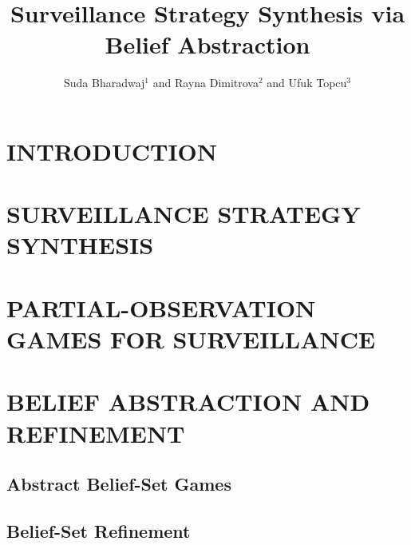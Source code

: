 \documentclass[letterpaper, 10 pt, conference]{ieeeconf}  %
\title{\LARGE \bf
Surveillance Strategy Synthesis via Belief Abstraction
}
\author{Suda Bharadwaj$^{1}$ and Rayna Dimitrova$^{2}$ and Ufuk Topcu$^{3}$%
}
\begin{document}
\maketitle
\thispagestyle{empty}
\pagestyle{empty}


\begin{abstract}

\end{abstract}


\section{INTRODUCTION}




\section{SURVEILLANCE STRATEGY SYNTHESIS}




\section{PARTIAL-OBSERVATION GAMES FOR SURVEILLANCE}



\section{BELIEF ABSTRACTION AND REFINEMENT}

\subsection{Abstract Belief-Set Games}


\subsection{Belief-Set Refinement}


\end{document}
